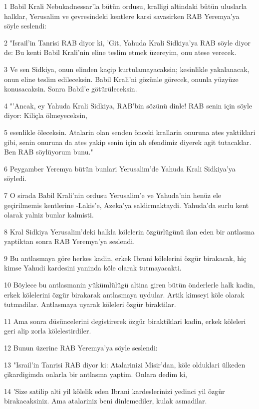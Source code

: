 \par 1 Babil Krali Nebukadnessar'la bütün ordusu, kralligi altindaki bütün uluslarla halklar, Yerusalim ve çevresindeki kentlere karsi savasirken RAB Yeremya'ya söyle seslendi:
\par 2 "Israil'in Tanrisi RAB diyor ki, 'Git, Yahuda Krali Sidkiya'ya RAB söyle diyor de: Bu kenti Babil Krali'nin eline teslim etmek üzereyim, onu atese verecek.
\par 3 Ve sen Sidkiya, onun elinden kaçip kurtulamayacaksin; kesinlikle yakalanacak, onun eline teslim edileceksin. Babil Krali'ni gözünle görecek, onunla yüzyüze konusacaksin. Sonra Babil'e götürüleceksin.
\par 4 "'Ancak, ey Yahuda Krali Sidkiya, RAB'bin sözünü dinle! RAB senin için söyle diyor: Kiliçla ölmeyeceksin,
\par 5 esenlikle öleceksin. Atalarin olan senden önceki krallarin onuruna ates yaktiklari gibi, senin onuruna da ates yakip senin için ah efendimiz diyerek agit tutacaklar. Ben RAB söylüyorum bunu."
\par 6 Peygamber Yeremya bütün bunlari Yerusalim'de Yahuda Krali Sidkiya'ya söyledi.
\par 7 O sirada Babil Krali'nin ordusu Yerusalim'e ve Yahuda'nin henüz ele geçirilmemis kentlerine -Lakis'e, Azeka'ya saldirmaktaydi. Yahuda'da surlu kent olarak yalniz bunlar kalmisti.
\par 8 Kral Sidkiya Yerusalim'deki halkla kölelerin özgürlügünü ilan eden bir antlasma yaptiktan sonra RAB Yeremya'ya seslendi.
\par 9 Bu antlasmaya göre herkes kadin, erkek Ibrani kölelerini özgür birakacak, hiç kimse Yahudi kardesini yaninda köle olarak tutmayacakti.
\par 10 Böylece bu antlasmanin yükümlülügü altina giren bütün önderlerle halk kadin, erkek kölelerini özgür birakarak antlasmaya uydular. Artik kimseyi köle olarak tutmadilar. Antlasmaya uyarak köleleri özgür biraktilar.
\par 11 Ama sonra düsüncelerini degistirerek özgür biraktiklari kadin, erkek köleleri geri alip zorla kölelestirdiler.
\par 12 Bunun üzerine RAB Yeremya'ya söyle seslendi:
\par 13 "Israil'in Tanrisi RAB diyor ki: Atalarinizi Misir'dan, köle olduklari ülkeden çikardigimda onlarla bir antlasma yaptim. Onlara dedim ki,
\par 14 'Size satilip alti yil kölelik eden Ibrani kardeslerinizi yedinci yil özgür birakacaksiniz. Ama atalariniz beni dinlemediler, kulak asmadilar.
